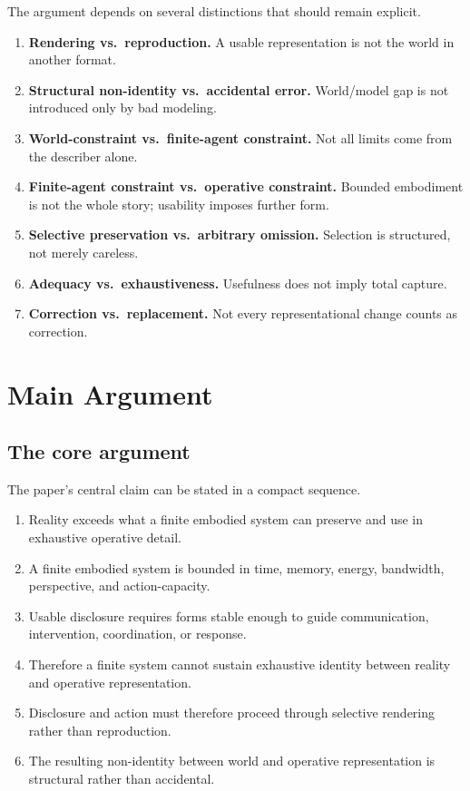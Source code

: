 \documentclass[11pt]{article}
\begin{document}
The argument depends on several distinctions that should remain explicit.

\begin{enumerate}
    \item \textbf{Rendering vs.\ reproduction.} A usable representation is not the world in another format.
    \item \textbf{Structural non-identity vs.\ accidental error.} World/model gap is not introduced only by bad modeling.
    \item \textbf{World-constraint vs.\ finite-agent constraint.} Not all limits come from the describer alone.
    \item \textbf{Finite-agent constraint vs.\ operative constraint.} Bounded embodiment is not the whole story; usability imposes further form.
    \item \textbf{Selective preservation vs.\ arbitrary omission.} Selection is structured, not merely careless.
    \item \textbf{Adequacy vs.\ exhaustiveness.} Usefulness does not imply total capture.
    \item \textbf{Correction vs.\ replacement.} Not every representational change counts as correction.
\end{enumerate}
\section{Main Argument}

\subsection{The core argument}

The paper's central claim can be stated in a compact sequence.

\begin{enumerate}
    \item Reality exceeds what a finite embodied system can preserve and use in exhaustive operative detail.
    \item A finite embodied system is bounded in time, memory, energy, bandwidth, perspective, and action-capacity.
    \item Usable disclosure requires forms stable enough to guide communication, intervention, coordination, or response.
    \item Therefore a finite system cannot sustain exhaustive identity between reality and operative representation.
    \item Disclosure and action must therefore proceed through selective rendering rather than reproduction.
    \item The resulting non-identity between world and operative representation is structural rather than accidental.
\end{enumerate}
\end{document}

